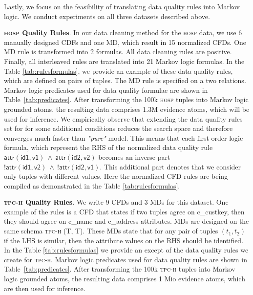 
Lastly, we focus on the feasibility of translating data quality rules into Markov logic. We conduct experiments on all three datasets described above. 

\textbf{\textsc{hosp} Quality Rules}. In our data cleaning method for the \textsc{hosp} data, we use 6 manually designed CDFs and one MD, which result in 15 normalized CFDs. One MD rule is transformed into 2 formulas. All data cleaning rules are positive. Finally, all interleaved rules are translated into 21 Markov logic formulas. In the Table \ref{tab:rulesformulas}, we provide an example of these data quality rules, which are defined on pairs of tuples. The MD rule is specified on a two relations. Markov logic predicates used for data quality formulae are shown in Table~\ref{tab:predicates}. After transforming the 100k \textsc{hosp} tuples into Markov logic grounded atoms, the resulting data comprises 1.3M evidence atoms, which will be used for inference. We empirically observe that extending the data quality rules set for for some additional conditions  reduces the search space and therefore converges much faster than \textit{"pure"} model. This means that each first order logic formula, which represent the RHS of the normalized data quality rule $\mathsf{\textsf{attr}(id1, v1)~\wedge~\textsf{attr}(id2, v2)}$ becomes an inverse part $\mathsf{!\textsf{attr}(id1, v2)~\wedge~!\textsf{attr}(id2, v1)}$. This additional part denotes that we consider only tuples with different values. Here the normalized CFD rules are being compiled as demonstrated in the Table \ref{tab:rulesformulas}. 

\textbf{\textsc{tpc-h} Quality Rules}. We write 9 CFDs and 3 MDs for this dataset. One example of the rules is a CFD that states if two tuples agree on \textsf{c\_custkey}, then they should agree on \textsf{c\_name} and \textsf{c\_address} attributes. MDs are designed on the same schema \textsc{tpc-h} \textsf{(T, T)}. These MDs state that for any pair of tuples $(t_1,t_2)$ if the LHS is similar, then the attribute values on the RHS should be identified. In the Table \ref{tab:rulesformulas} we provide an except of the data quality rules we create for \textsc{tpc-h}. Markov logic predicates used for data quality rules are shown in Table~\ref{tab:predicates}. After transforming the 100k \textsc{tpc-h} tuples into Markov logic grounded atoms, the resulting data comprises 1 Mio evidence atoms, which are then used for inference. 

